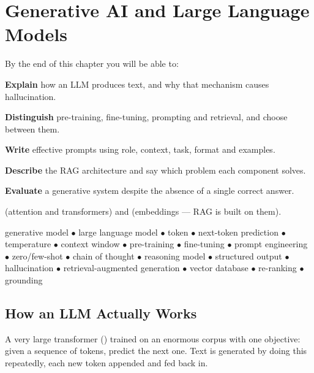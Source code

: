 \chapter{Generative AI and Large Language Models}\label{ch:genai}

\begin{outcomes}
By the end of this chapter you will be able to:
\begin{tight}
  \item \textbf{Explain} how an LLM produces text, and why that mechanism causes hallucination.
  \item \textbf{Distinguish} pre-training, fine-tuning, prompting and retrieval, and choose between them.
  \item \textbf{Write} effective prompts using role, context, task, format and examples.
  \item \textbf{Describe} the RAG architecture and say which problem each component solves.
  \item \textbf{Evaluate} a generative system despite the absence of a single correct answer.
\end{tight}
\end{outcomes}

\begin{prereq}
 (attention and transformers) and  (embeddings ---
RAG is built on them).
\end{prereq}

\begin{keyterms}
generative model $\bullet$ large language model $\bullet$ token $\bullet$
next-token prediction $\bullet$ temperature $\bullet$ context window $\bullet$
pre-training $\bullet$ fine-tuning $\bullet$ prompt engineering $\bullet$
zero/few-shot $\bullet$ chain of thought $\bullet$ reasoning model $\bullet$
structured output $\bullet$ hallucination $\bullet$ retrieval-augmented generation
$\bullet$ vector database $\bullet$ re-ranking $\bullet$ grounding
\end{keyterms}

\section{How an LLM Actually Works}

\begin{definitionbox}
A very large transformer () trained on an enormous corpus with
one objective: given a sequence of tokens, predict the next one. Text is generated
by doing this repeatedly, each new token appended and fed back in.
\end{definitionbox}

